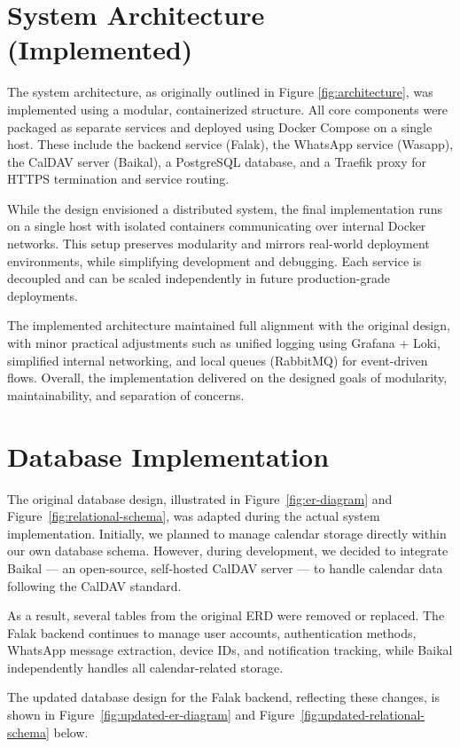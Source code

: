 \section{System Architecture (Implemented)}

The system architecture, as originally outlined in Figure \ref{fig:architecture}, was implemented using a modular, containerized structure. All core components were packaged as separate services and deployed using Docker Compose on a single host. These include the backend service (Falak), the WhatsApp service (Wasapp), the CalDAV server (Baikal), a PostgreSQL database, and a Traefik proxy for HTTPS termination and service routing.

While the design envisioned a distributed system, the final implementation runs on a single host with isolated containers communicating over internal Docker networks. This setup preserves modularity and mirrors real-world deployment environments, while simplifying development and debugging. Each service is decoupled and can be scaled independently in future production-grade deployments.

The implemented architecture maintained full alignment with the original design, with minor practical adjustments such as unified logging using Grafana + Loki, simplified internal networking, and local queues (RabbitMQ) for event-driven flows. Overall, the implementation delivered on the designed goals of modularity, maintainability, and separation of concerns.


\section{Database Implementation}

The original database design, illustrated in Figure~\ref{fig:er-diagram} and Figure~\ref{fig:relational-schema}, was adapted during the actual system implementation. Initially, we planned to manage calendar storage directly within our own database schema. However, during development, we decided to integrate Baikal — an open-source, self-hosted CalDAV server — to handle calendar data following the CalDAV standard.

As a result, several tables from the original ERD were removed or replaced. The Falak backend continues to manage user accounts, authentication methods, WhatsApp message extraction, device IDs, and notification tracking, while Baikal independently handles all calendar-related storage.

The updated database design for the Falak backend, reflecting these changes, is shown in Figure~\ref{fig:updated-er-diagram} and Figure~\ref{fig:updated-relational-schema} below.

